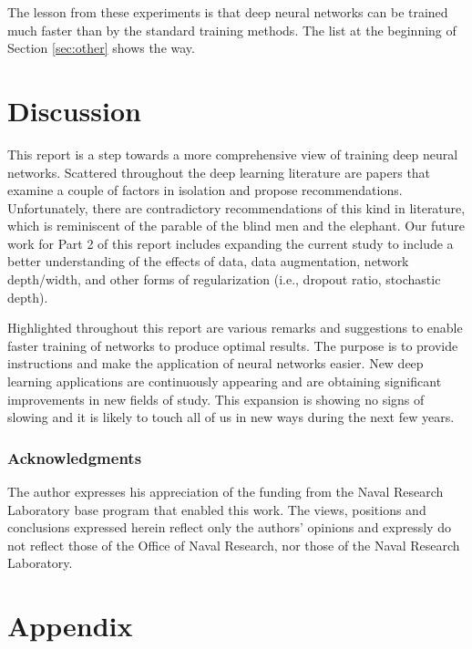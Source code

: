 \documentclass{article} %
\begin{document}
The lesson from these experiments is that deep neural networks can be trained much faster than by the standard training methods.  The list at the beginning of Section \ref{sec:other} shows the way.




\section{Discussion}


This report is a step towards a more comprehensive view of training deep neural networks.  Scattered throughout the deep learning literature are papers that examine a couple of factors in isolation and propose recommendations.  Unfortunately, there are contradictory recommendations of this kind in literature, which is reminiscent of the parable of the blind men and the elephant. Our future work for Part 2 of this report includes expanding the current study to include a better understanding of the effects of data, data augmentation, network depth/width, and other forms of regularization (i.e., dropout ratio, stochastic depth).

Highlighted throughout this report are various remarks and suggestions to enable faster training of networks to produce optimal results.  The purpose is to provide instructions and make the application of neural networks easier.  New deep learning applications are continuously appearing and are obtaining significant improvements in new fields of study.  This expansion is showing no signs of slowing and it is likely to touch all of us in new ways during the next few years.


\subsubsection*{Acknowledgments}

The author expresses his appreciation of the funding from the Naval Research Laboratory base program that enabled this work. The views, positions and conclusions expressed herein reflect only the authors' opinions and expressly do not reflect those of the Office of Naval Research, nor those of the Naval Research Laboratory.




\appendix


\section{Appendix}
\end{document}
